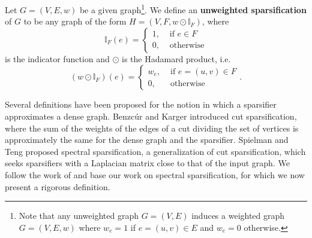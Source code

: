 \documentclass[final,leqno,onefignum,onetabnum]{siamltex1213}
\begin{document}
\begin{definition} 
Let $G = \left(V,E, w \right)$ be a given graph\footnote{Note that any unweighted graph $G =
\left(V,E\right)$ induces a weighted graph $G = \left( V, E,
w \right)$ where $w_{e} = 1$ if $e=(u,v)\in E$ and
$w_{e} = 0$ otherwise.
}. We define an
{\bf unweighted sparsification} of $G$ to be any graph of the form $H
= \left(V, F,w \odot \mathbb{I}_F \right)$, where 
\[\mathbb{I}_F(e) = \left\{ \begin{array} {ll} 1, & \text{ if } e \in F \\ 0, &
\text{ otherwise} \end{array} \right. \]
is the indicator function and
$\odot$ is the Hadamard product, i.e.
\[ \left(w \odot \mathbb{I}_F \right) (e) = \left\{
\begin{array}{ll} w_{e}, & \text{ if } e = (u,v) \in F \\ 0, &
\text{ otherwise} \end{array}. \right.\]
\end{definition}

Several definitions have been proposed for the notion in which a sparsifier approximates a dense graph.  Benzc\'{u}r and Karger \cite{conf/stoc/BenczurK96} introduced cut sparsification, where the sum of the weights of the edges of a cut dividing the set of vertices is approximately the same for the dense graph and the sparsifier.  Spielman and Teng \cite{spectsim} proposed spectral sparsification, a generalization of cut sparsification, which seeks sparsifiers with a Laplacian matrix close to that of the input graph.  We follow the work of \cite{ramanujansparse,spectsim} and base our work on spectral sparsification, for which we now present a rigorous definition.
\end{document}
